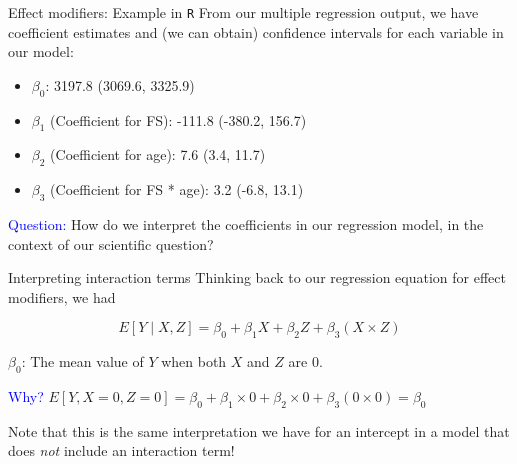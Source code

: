\documentclass[10pt,t]{beamer}
\begin{document}
\begin{frame}{Effect modifiers: Example in \texttt{R}}
From our multiple regression output, we have coefficient estimates and (we can obtain) confidence intervals for each variable in our model:

\vspace{0.3cm}

\begin{itemize}
	\item $\beta_0$: 3197.8 (3069.6, 3325.9)
	\item $\beta_1$ (Coefficient for FS): -111.8 (-380.2, 156.7)
	\item $\beta_2$ (Coefficient for age): 7.6 (3.4, 11.7)
	\item $\beta_3$ (Coefficient for FS * age): 3.2 (-6.8, 13.1)
\end{itemize}

\vspace{0.3cm}


\textcolor{blue}{Question:} How do we interpret the coefficients in our regression model, in the context of our scientific question? 
\end{frame}

\begin{frame}{Interpreting interaction terms}
Thinking back to our regression equation for effect modifiers, we had

$$
E[Y \mid X, Z] = \beta_0 + \beta_1 X + \beta_2 Z + \beta_3 (X \times Z)
$$

$\beta_0$: The mean value of $Y$ when both $X$ and $Z$ are 0.

\vspace{0.3cm}

\textcolor{blue}{Why?} \pause $E[Y, X = 0, Z = 0] = \beta_0 + \beta_1 \times 0 + \beta_2 \times 0 + \beta_3 (0 \times 0) = \beta_0$

\pause \vspace{0.3cm}

Note that this is the same interpretation we have for an intercept in a model that does \textit{not} include an interaction term!

\end{frame}
\end{document}
